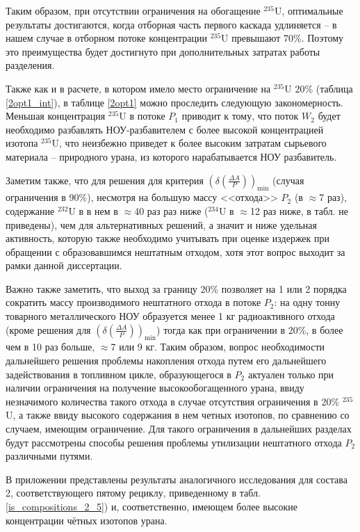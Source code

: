 Таким образом, при отсутствии ограничения на обогащение $^{235}$U, оптимальные результаты достигаются, когда отборная часть первого каскада удлиняется -- в нашем случае в отборном потоке концентрации $^{235}$U превышают 70\%. Поэтому это преимущества будет достигнуто при дополнительных затратах работы разделения.

Также как и в расчете, в котором имело место ограничение на $^{235}$U 20\% (таблица \ref{2opt1_int}), в таблице \ref{2opt1} можно проследить следующую закономерность. Меньшая концентрация $^{235}$U в потоке $P_{1}$ приводит к тому, что поток $W_{2}$ будет необходимо разбавлять НОУ-разбавителем с более высокой концентрацией изотопа $^{235}$U, что неизбежно приведет к более высоким затратам сырьевого материала -- природного урана, из которого нарабатывается НОУ разбавитель.

Заметим также, что для решения для критерия $(\delta(\frac{\Delta A}{P}))_\text{min}$ (случая ограничения в 90\%), несмотря на большую массу <<отхода>> $P_{2}$ (в $\approx$7 раз), содержание $^{232}$U в в нем в $\approx$40 раз раз ниже ($^{234}$U в $\approx$12 раз ниже, в табл. не приведены), чем для альтернативных решений, а значит и ниже удельная активность, которую также необходимо учитывать при оценке издержек при обращении с образовавшимся нештатным отходом, хотя этот вопрос выходит за рамки данной диссертации.

Важно также заметить, что выход за границу 20\% позволяет на 1 или 2 порядка сократить массу производимого нештатного отхода в потоке $P_{2}$: на одну тонну товарного металлического НОУ образуется менее 1 кг радиоактивного отхода (кроме решения для $(\delta(\frac{\Delta A}{P}))_\text{min}$) тогда как при ограничении в 20\%, в более чем в 10 раз больше, $\approx$7 или 9 кг. Таким образом, вопрос необходимости дальнейшего решения проблемы накопления отхода путем его дальнейшего задействования в топливном цикле, образующегося в $P_{2}$ актуален только при наличии ограничения на получение высокообогащенного урана, ввиду незначимого количества такого отхода в случае отсутствия ограничения в 20\% $^{235}$U, а также ввиду высокого содержания в нем четных изотопов, по сравнению со случаем, имеющим ограничение. Для такого ограничения в дальнейших разделах будут рассмотрены способы решения проблемы утилизации нештатного отхода $P_{2}$ различными путями. 



В приложении представлены результаты аналогичного исследования для состава 2, соответствующего пятому рециклу, приведенному в табл. \ref{is_compositions_2_5}) и, соответственно, имеющем более высокие концентрации чётных изотопов урана.




